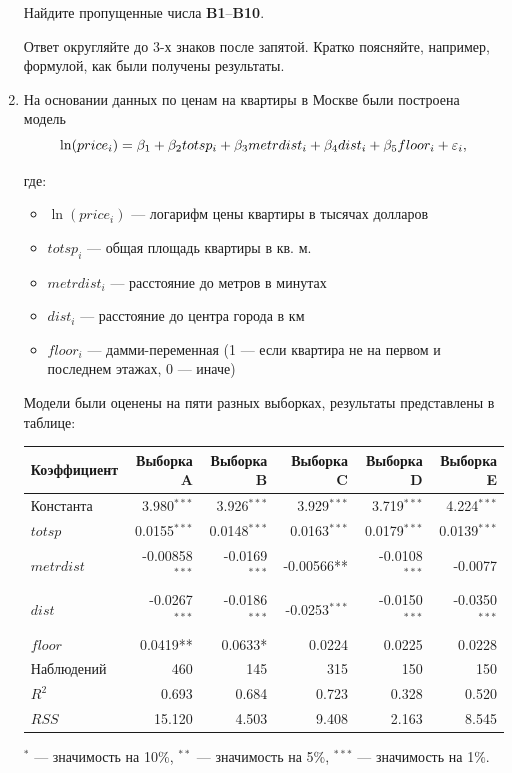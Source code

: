 \documentclass[12pt, a4paper]{article}
\begin{document}
\begin{enumerate}
Найдите пропущенные числа \textbf{B1}--\textbf{B10}.

Ответ округляйте до 3-х знаков после запятой. Кратко поясняйте, например, формулой, как были получены результаты.


\item На основании данных по ценам на квартиры в Москве были построена модель
\[
\ln(price_i)=\beta_1 + \beta_2 totsp_i + \beta_3 metrdist_i + \beta_4 dist_i +\beta_5 floor_i +\varepsilon_i,
\]

где:
\begin{itemize}
\item $\ln(price_i)$ — логарифм цены квартиры в тысячах долларов
\item $totsp_i$ — общая площадь квартиры в кв. м.
\item $metrdist_i$ — расстояние до метров в минутах
\item $dist_i$ — расстояние до центра города в км
\item $floor_i$ — дамми-переменная (1 — если квартира не на первом и последнем этажах, 0 — иначе)
\end{itemize}

Модели были оценены на пяти разных выборках, результаты представлены в таблице:


\begin{tabular}{lrrrrr} \toprule
Коэффициент & Выборка A & Выборка B & Выборка C & Выборка D & Выборка E \\
\midrule
Константа & 3.980$^{***}$ & 3.926$^{***}$ & 3.929$^{***}$ & 3.719$^{***}$ & 4.224$^{***}$ \\
$totsp$ & 0.0155$^{***}$ & 0.0148$^{***}$ & 0.0163$^{***}$ & 0.0179$^{***}$ & 0.0139$^{***}$ \\
$metrdist$ & -0.00858$^{***}$ & -0.0169$^{***}$ & -0.00566** & -0.0108$^{***}$ & -0.0077 \\
$dist$ & -0.0267$^{***}$ & -0.0186$^{***}$ & -0.0253$^{***}$ & -0.0150$^{***}$ & -0.0350$^{***}$ \\
$floor$ & 0.0419** & 0.0633* & 0.0224 & 0.0225 & 0.0228 \\
Наблюдений & 460 & 145 & 315 & 150 & 150 \\
$R^2$ & 0.693 & 0.684 & 0.723 & 0.328 & 0.520 \\
$RSS$ & 15.120 & 4.503 & 9.408 & 2.163 & 8.545 \\
\bottomrule
\end{tabular}

$^{*}$ — значимость на 10\%, $^{**}$ — значимость на 5\%, $^{***}$ — значимость на 1\%.



\end{enumerate}
\end{document}

